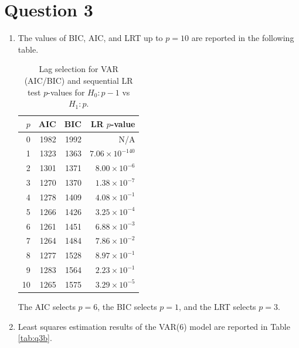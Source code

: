 \documentclass[12pt]{article}
\begin{document}
\newpage
\section*{Question 3}
\begin{enumerate}[label=\alph*.]
   \item The values of BIC, AIC, and LRT up to $p=10$ are reported in the following table.

   \begin{table}[H]
   \centering
   \caption{Lag selection for VAR (AIC/BIC) and sequential LR test \(p\)-values for \(H_0: p-1\) vs \(H_1: p\).}
   \begin{tabular}{r r r r}
   \hline
   \(p\) & AIC & BIC & LR \(p\)-value \\
   \hline
   0  & 1982 & 1992 &  N/A \\
   1  & 1323 & 1363 & \(7.06\times 10^{-140}\) \\
   2  & 1301 & 1371 & \(8.00\times 10^{-6}\) \\
   3  & 1270 & 1370 & \(1.38\times 10^{-7}\) \\
   4  & 1278 & 1409 & \(4.08\times 10^{-1}\) \\
   5  & 1266 & 1426 & \(3.25\times 10^{-4}\) \\
   6  & 1261 & 1451 & \(6.88\times 10^{-3}\) \\
   7  & 1264 & 1484 & \(7.86\times 10^{-2}\) \\
   8  & 1277 & 1528 & \(8.97\times 10^{-1}\) \\
   9  & 1283 & 1564 & \(2.23\times 10^{-1}\) \\
   10 & 1265 & 1575 & \(3.29\times 10^{-5}\) \\
   \hline
   \end{tabular}
   \end{table}
   The AIC selects $p=6$, the BIC selects $p=1$, and the LRT selects $p=3$.

   \newpage
   \item Least squares estimation results of the VAR(6) model are reported in Table \ref{tab:q3b}.


\end{enumerate}
\end{document}
